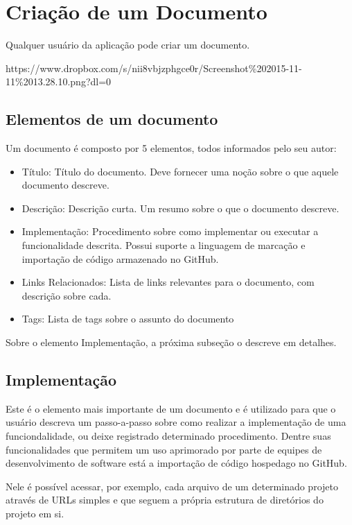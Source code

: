 \section{Criação de um Documento}

Qualquer usuário da aplicação pode criar um documento.

https://www.dropbox.com/s/nii8vbjzphgce0r/Screenshot\%202015-11-11\%2013.28.10.png?dl=0

\subsection{Elementos de um documento}

Um documento é composto por 5 elementos, todos informados pelo seu autor:

\begin{itemize}
  \item Título: Título do documento. Deve fornecer uma noção sobre o que aquele documento descreve.
  \item Descrição: Descrição curta. Um resumo sobre o que o documento descreve.
  \item Implementação: Procedimento sobre como implementar ou executar a funcionalidade descrita. Possui suporte a linguagem de marcação e importação de código armazenado no GitHub.
  \item Links Relacionados: Lista de links relevantes para o documento, com descrição sobre cada.
  \item Tags: Lista de tags sobre o assunto do documento
\end{itemize}

Sobre o elemento Implementação, a próxima subseção o descreve em detalhes.

\subsection{Implementação}

Este é o elemento mais importante de um documento e é utilizado para que o usuário descreva um passo-a-passo sobre
como realizar a implementação de uma funciondalidade, ou deixe registrado determinado procedimento. Dentre suas funcionalidades que permitem um uso aprimorado por parte de equipes de desenvolvimento de software está a importação de código hospedago no GitHub.

Nele é possível acessar, por exemplo, cada arquivo de um determinado projeto através de URLs simples e que seguem a própria estrutura de diretórios do projeto em si.

